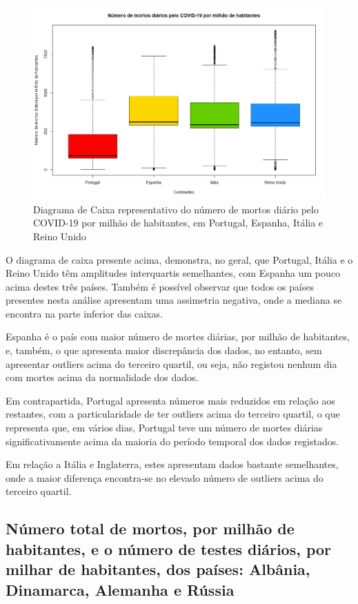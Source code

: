 \documentclass[conference]{IEEEtran}
\begin{document}
\begin{figure}[htbp]
\centerline{\includegraphics[width=0.95\columnwidth]{images/01.c.png}}
\caption{Diagrama de Caixa representativo do número de mortos diário pelo COVID-19 por milhão de habitantes, em Portugal, Espanha, Itália e Reino Unido}
\label{fig}
\end{figure}

O diagrama de caixa presente acima, demonstra, no geral, que Portugal, Itália e o Reino Unido têm amplitudes interquartis semelhantes, com Espanha um pouco acima destes três países. Também é possível observar que todos os países presentes nesta análise apresentam uma assimetria negativa, onde a mediana se encontra na parte inferior das caixas.

Espanha é o país com maior número de mortes diárias, por milhão de habitantes, e, também, o que apresenta maior discrepância dos dados, no entanto, sem apresentar outliers acima do terceiro quartil, ou seja, não registou nenhum dia com mortes acima da normalidade dos dados.

Em contrapartida, Portugal apresenta números mais reduzidos em relação aos restantes, com a particularidade de ter outliers acima do terceiro quartil, o que representa que, em vários dias, Portugal teve um número de mortes diárias significativamente acima da maioria do período temporal dos dados registados.

Em relação a Itália e Inglaterra, estes apresentam dados bastante semelhantes, onde a maior diferença encontra-se no elevado número de outliers acima do terceiro quartil.


\subsection{Número total de mortos, por milhão de habitantes, e o número de testes diários, por milhar de habitantes, dos países: Albânia, Dinamarca, Alemanha e Rússia}
\end{document}
